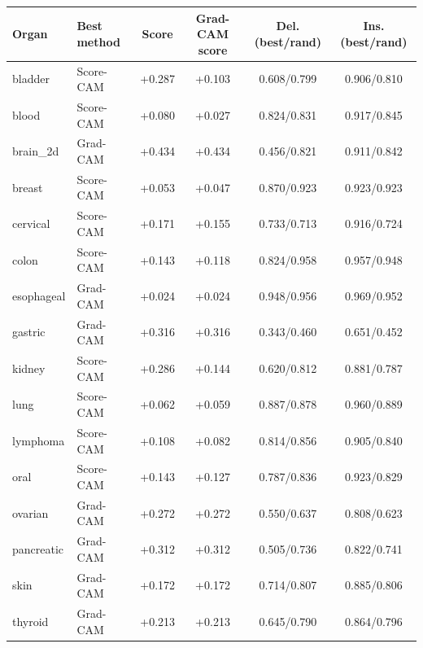 \begin{tabular}{@{}llcccc@{}}
\toprule
Organ & Best method & Score & Grad-CAM score & Del. (best/rand) & Ins. (best/rand) \\
\midrule
bladder & Score-CAM & +0.287 & +0.103 & 0.608/0.799 & 0.906/0.810 \\
blood & Score-CAM & +0.080 & +0.027 & 0.824/0.831 & 0.917/0.845 \\
brain\_2d & Grad-CAM & +0.434 & +0.434 & 0.456/0.821 & 0.911/0.842 \\
breast & Score-CAM & +0.053 & +0.047 & 0.870/0.923 & 0.923/0.923 \\
cervical & Score-CAM & +0.171 & +0.155 & 0.733/0.713 & 0.916/0.724 \\
colon & Score-CAM & +0.143 & +0.118 & 0.824/0.958 & 0.957/0.948 \\
esophageal & Grad-CAM & +0.024 & +0.024 & 0.948/0.956 & 0.969/0.952 \\
gastric & Grad-CAM & +0.316 & +0.316 & 0.343/0.460 & 0.651/0.452 \\
kidney & Score-CAM & +0.286 & +0.144 & 0.620/0.812 & 0.881/0.787 \\
lung & Score-CAM & +0.062 & +0.059 & 0.887/0.878 & 0.960/0.889 \\
lymphoma & Score-CAM & +0.108 & +0.082 & 0.814/0.856 & 0.905/0.840 \\
oral & Score-CAM & +0.143 & +0.127 & 0.787/0.836 & 0.923/0.829 \\
ovarian & Grad-CAM & +0.272 & +0.272 & 0.550/0.637 & 0.808/0.623 \\
pancreatic & Grad-CAM & +0.312 & +0.312 & 0.505/0.736 & 0.822/0.741 \\
skin & Grad-CAM & +0.172 & +0.172 & 0.714/0.807 & 0.885/0.806 \\
thyroid & Grad-CAM & +0.213 & +0.213 & 0.645/0.790 & 0.864/0.796 \\
\bottomrule
\end{tabular}